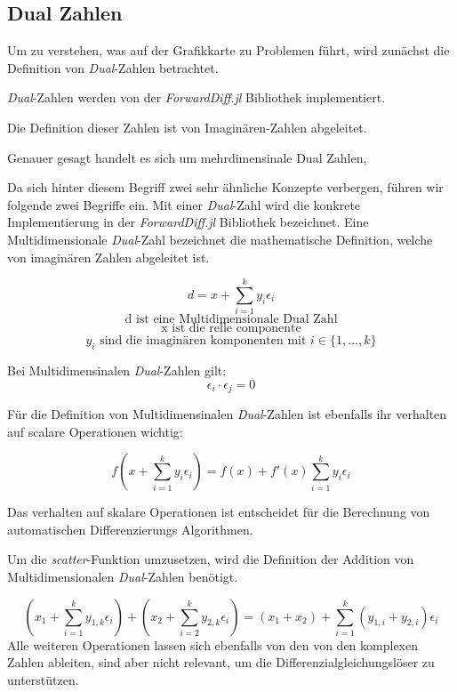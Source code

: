 \subsection{Dual Zahlen} \label{sec:dual_zahlen}

Um zu verstehen, was auf der Grafikkarte zu Problemen führt, 
wird zunächst die Definition von \textit{Dual}-Zahlen betrachtet.

\textit{Dual}-Zahlen werden von der \textit{ForwardDiff.jl} Bibliothek \cite{juliaForwardDiffPackage}
implementiert. 

Die Definition dieser Zahlen ist von Imaginären-Zahlen abgeleitet.

Genauer gesagt handelt es sich um mehrdimensinale Dual Zahlen, 

Da sich hinter diesem Begriff zwei sehr ähnliche Konzepte verbergen, 
führen wir folgende zwei Begriffe ein.
Mit einer \textit{Dual}-Zahl wird die konkrete Implementierung in der \textit{ForwardDiff.jl} Bibliothek \cite{juliaForwardDiffPackage} bezeichnet.
Eine Multidimensionale \textit{Dual}-Zahl bezeichnet die mathematische Definition, 
welche von imaginären Zahlen abgeleitet ist.

\begin{equation}
 d = x + \sum_{i = 1}^{k} y_i \epsilon_i 
\end{equation}
$$ \text{ d ist eine Multidimensionale Dual Zahl } $$ 
$$ \text{ x ist die relle componente } $$ 
$$ y_i \text{ sind die imaginären komponenten mit } i \in \{1, ..., k\} $$

Bei Multidimensinalen \textit{Dual}-Zahlen gilt:
\begin{equation}
 \epsilon_i \cdot \epsilon_j = 0
\end{equation}

Für die Definition von Multidimensinalen \textit{Dual}-Zahlen \cite{juliaForwardDiffPackage}
ist ebenfalls ihr verhalten auf scalare Operationen wichtig:

\begin{equation}
 f( x + \sum_{i = 1}^{k} y_i \epsilon_i  ) = f(x) +  f'(x) \sum_{i = 1}^{k} y_i \epsilon_i
\end{equation}

Das verhalten auf skalare Operationen ist entscheidet 
für die Berechnung von automatischen Differenzierungs Algorithmen.

Um die \textit{scatter}-Funktion umzusetzen, 
wird die Definition der Addition von Multidimensionalen \textit{Dual}-Zahlen \cite{RecentAdvances} benötigt.

\begin{equation}
(x_1 + \sum_{i = 1}^{k} y_{1,k} \epsilon_i) + ( x_2 + \sum_{i = 2}^{k} y_{2,k} \epsilon_i) = (x_1 + x_2) + \sum_{i = 1}^{k} (y_{1, i} + y_{2, i}) \epsilon_i
\end{equation}
Alle weiteren Operationen lassen sich ebenfalls von den von den komplexen Zahlen ableiten, 
sind aber nicht relevant, um die Differenzialgleichungslöser zu unterstützen.
